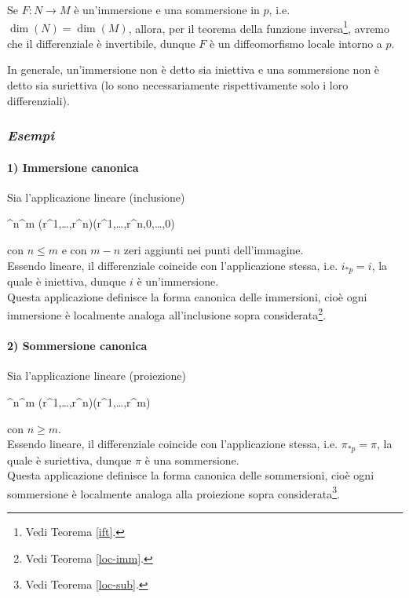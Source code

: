 \begin{remark}
	Se $ F : N \to M $ è un'immersione e una sommersione in $ p $, i.e. $ \dim(N) = \dim(M) $, allora, per il teorema della funzione inversa\footnote{%
		Vedi Teorema \ref{ift}.%
	}, avremo che il differenziale è invertibile, dunque $ F $ è un diffeomorfismo locale intorno a $ p $.
\end{remark}

\begin{remark}
	In generale, un'immersione non è detto sia iniettiva e una sommersione non è detto sia suriettiva (lo sono necessariamente rispettivamente solo i loro differenziali).
\end{remark}

\subsubsection{\textit{Esempi}}

\paragraph{1) Immersione canonica}

Sia l'applicazione lineare (inclusione)

	{\R^{n}}{\R^{m}}
	{(r^{1},\dots,r^{n})}{(r^{1},\dots,r^{n},0,\dots,0)}

con $ n \leqslant m $ e con $ m-n $ zeri aggiunti nei punti dell'immagine.\\
Essendo lineare, il differenziale coincide con l'applicazione stessa, i.e. $ i_{*p} = i $, la quale è iniettiva, dunque $ i $ è un'immersione.\\
Questa applicazione definisce la forma canonica delle immersioni, cioè ogni immersione è localmente analoga all'inclusione sopra considerata\footnote{%
	Vedi Teorema \ref{loc-imm}.%
}.

\paragraph{2) Sommersione canonica}

Sia l'applicazione lineare (proiezione)

\map{\pi}
	{\R^{n}}{\R^{m}}
	{(r^{1},\dots,r^{n})}{(r^{1},\dots,r^{m})}

con $ n \geqslant m $.\\
Essendo lineare, il differenziale coincide con l'applicazione stessa, i.e. $ \pi_{*p} = \pi $, la quale è suriettiva, dunque $ \pi $ è una sommersione.\\
Questa applicazione definisce la forma canonica delle sommersioni, cioè ogni sommersione è localmente analoga alla proiezione sopra considerata\footnote{%
	Vedi Teorema \ref{loc-sub}.%
}.

